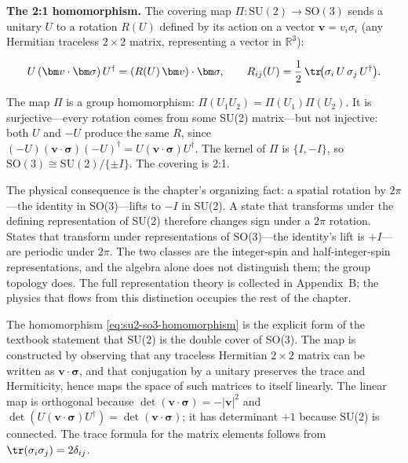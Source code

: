 \medskip\noindent\textbf{The 2:1 homomorphism.} The covering map $\Pi:\mathrm{SU}(2)\to\mathrm{SO}(3)$ sends a unitary $U$ to a rotation $R(U)$ defined by its action on a vector $\bm v = v_i\sigma_i$ (any Hermitian traceless $2\times2$ matrix, representing a vector in $\mathbb{R}^3$):
\begin{linenomath}
    \begin{equation}
        U\,(\bm v\cdot\bm\sigma)\,U^\dagger = (R(U)\,\bm v)\cdot\bm\sigma,
        \qquad
        R_{ij}(U) = \frac{1}{2}\,\tr\!\bigl(\sigma_i\,U\,\sigma_j\,U^\dagger\bigr).
        \label{eq:su2-so3-homomorphism}
    \end{equation}
\end{linenomath}
The map $\Pi$ is a group homomorphism: $\Pi(U_1U_2)=\Pi(U_1)\Pi(U_2)$. It is surjective---every rotation comes from some SU(2) matrix---but not injective: both $U$ and $-U$ produce the same $R$, since $(-U)(\bm v\cdot\bm\sigma)(-U)^\dagger = U(\bm v\cdot\bm\sigma)U^\dagger$. The kernel of $\Pi$ is $\{I,-I\}$, so $\mathrm{SO}(3) \cong \mathrm{SU}(2)/\{\pm I\}$. The covering is 2:1.

The physical consequence is the chapter's organizing fact: a spatial rotation by $2\pi$---the identity in SO(3)---lifts to $-I$ in SU(2). A state that transforms under the defining representation of SU(2) therefore changes sign under a $2\pi$ rotation. States that transform under representations of SO(3)---the identity's lift is $+I$---are periodic under $2\pi$. The two classes are the integer-spin and half-integer-spin representations, and the algebra alone does not distinguish them; the group topology does. The full representation theory is collected in Appendix~B; the physics that flows from this distinction occupies the rest of the chapter.

\begin{note}
    The homomorphism \eqref{eq:su2-so3-homomorphism} is the explicit form of the textbook statement that SU(2) is the double cover of SO(3). The map is constructed by observing that any traceless Hermitian $2\times2$ matrix can be written as $\bm v\cdot\bm\sigma$, and that conjugation by a unitary preserves the trace and Hermiticity, hence maps the space of such matrices to itself linearly. The linear map is orthogonal because $\det(\bm v\cdot\bm\sigma) = -|\bm v|^2$ and $\det(U(\bm v\cdot\bm\sigma)U^\dagger)=\det(\bm v\cdot\bm\sigma)$; it has determinant $+1$ because SU(2) is connected. The trace formula for the matrix elements follows from $\tr(\sigma_i\sigma_j)=2\delta_{ij}$.
\end{note}

